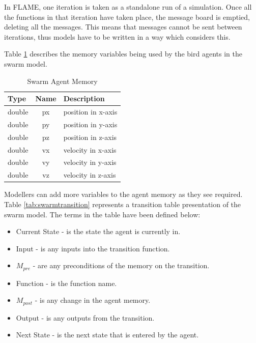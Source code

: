 In FLAME, one iteration is taken as a
standalone run of a simulation. Once all the functions in that iteration have taken place, the message board is emptied, deleting all the messages. This means that messages cannot be sent between iterations, thus models have to be written in a way which considers this.

Table \ref{tab:swarm_memory} describes the memory variables being used by the bird agents in the swarm model. 


\begin{table}[ht]
\centering
\begin{tabular}{|l||c||l|}
\hline
Type&Name&Description\\
\hline \hline
double&px&position in x-axis\\
\hline
double&py&position in y-axis\\
\hline
double&pz&position in z-axis\\
\hline
double&vx&velocity in x-axis\\
\hline
double&vy&velocity in y-axis\\
\hline
double&vz&velocity in z-axis\\
\hline
\end{tabular}
\caption{Swarm Agent Memory}
\label{tab:swarm_memory}
\end{table}

Modellers can add more variables to the agent memory as they see required. Table \ref{tab:swarmtransition} represents a transition table presentation of the swarm model. The terms in the table have been defined below:

\begin{itemize}
  \item Current State - is the state the agent is currently in.
  \item Input - is any inputs into the transition function.
  \item $M_{pre}$ - are any preconditions of the memory on the transition.
  \item Function - is the function name.
  \item $M_{post}$ - is any change in the agent memory.
  \item Output - is any outputs from the transition.
  \item Next State - is the next state that is entered by the agent.
\end{itemize}

